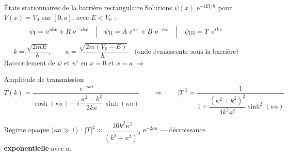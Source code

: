 \documentclass[10pt,aspectratio=169]{beamer}
\newcommand{\hb}{\hbar}
\newcommand{\eg}{\,\mathrm{e}}
\begin{document}
\begin{frame}{États stationnaires de la barrière rectangulaire}
  Solutions $\psi(x)\,\eg^{-iEt/\hb}$ pour $V(x) = V_0$ sur $[0,a]$, avec $E < V_0$ :
  \[
    \psi_{\rm I} = \eg^{ikx} + R\,\eg^{-ikx}
    \quad\Big|\quad
    \psi_{\rm II} = A\,\eg^{\kappa x} + B\,\eg^{-\kappa x}
    \quad\Big|\quad
    \psi_{\rm III} = T\,\eg^{ikx}
  \]
  \[
    k = \frac{\sqrt{2mE}}{\hb}, \qquad
    \kappa = \frac{\sqrt{2m(V_0 - E)}}{\hb}
    \quad \text{(onde évanescente sous la barrière)}
  \]
  \vspace{0.3em}
  Raccordement de $\psi$ et $\psi'$ en $x=0$ et $x=a$ $\Rightarrow$
  \begin{block}{Amplitude de transmission}
    \[
      T(k) = \frac{\eg^{-ika}}{\cosh(\kappa a)
             + i\,\dfrac{\kappa^2 - k^2}{2k\kappa}\,\sinh(\kappa a)}
      \qquad\Rightarrow\qquad
      |T|^2 = \frac{1}{1 + \dfrac{(\kappa^2+k^2)^2}{4k^2\kappa^2}\sinh^2(\kappa a)}
    \]
  \end{block}
  Régime opaque ($\kappa a \gg 1$) :
  $|T|^2 \approx \dfrac{16k^2\kappa^2}{(k^2+\kappa^2)^2}\,\eg^{-2\kappa a}$
  — décroissance \textbf{exponentielle} avec $a$.
\end{frame}
\end{document}
